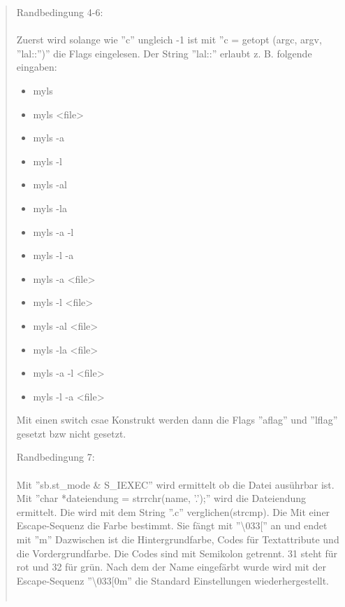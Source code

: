 \begin{quote}
			Randbedingung 4-6:\\ \\
			\tiny
			Zuerst wird solange wie ''c'' ungleich -1 ist mit ''c = getopt (argc, argv, ''lal::'')'' die Flags eingelesen. Der String ''lal::'' erlaubt z. B. folgende eingaben:\\
			\begin{itemize}
				\item myls\\
				\item myls <file>\\
				\item myls -a\\
				\item myls -l\\
				\item myls -al\\
				\item myls -la\\
				\item myls -a -l\\
				\item myls -l -a\\
				\item myls -a <file>\\
				\item myls -l <file>\\
				\item myls -al <file>\\
				\item myls -la <file>\\
				\item myls -a -l <file>\\
				\item myls -l -a <file>\\
			\end{itemize}
			Mit einen switch csae Konstrukt werden dann die Flags ''aflag'' und ''lflag'' gesetzt bzw nicht gesetzt.
			
			Randbedingung 7:\\ \\
			\tiny
			Mit ''sb.st\_mode \& S\_IEXEC'' wird ermittelt ob die Datei aus\"uhrbar ist. Mit ''char *dateiendung = strrchr(name, '.');'' wird die Dateiendung ermittelt. Die wird mit dem String ''.c'' verglichen(strcmp). Die Mit einer Escape-Sequenz die Farbe bestimmt. Sie f\"angt mit ''\textbackslash 033{[}'' an und endet mit ''m''
			Dazwischen ist die Hintergrundfarbe, Codes f\"ur Textattribute und die Vordergrundfarbe. Die Codes sind mit Semikolon getrennt. 31 steht f\"ur rot und 32 f\"ur gr\"un. Nach dem der Name eingef\"arbt wurde wird mit der Escape-Sequenz ''\textbackslash 033{[}0m'' die Standard Einstellungen wiederhergestellt.\\ \\
		\end{quote}
